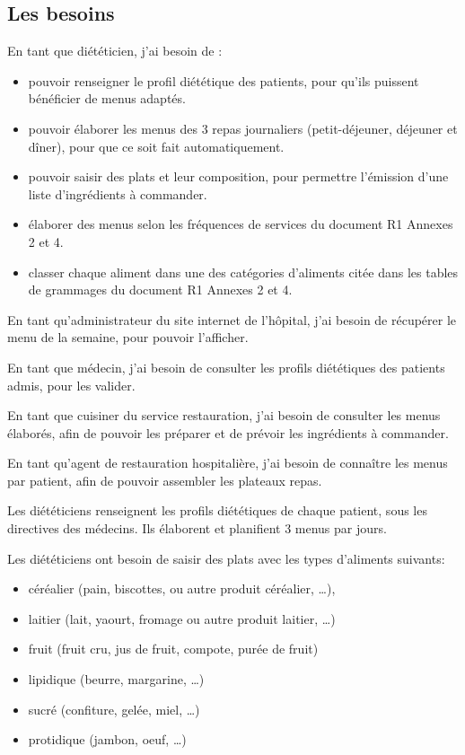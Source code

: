 \subsection{Les besoins}
En tant que diététicien, j’ai besoin de :
\begin{itemize}
 \item pouvoir renseigner le profil diététique des patients, pour qu’ils puissent bénéficier de menus adaptés.
 \item pouvoir élaborer les menus des 3 repas journaliers (petit-déjeuner, déjeuner et dîner), pour que ce soit fait automatiquement.
 \item pouvoir saisir des plats et leur composition, pour permettre l’émission d’une liste d’ingrédients à commander.
 \item élaborer des menus selon les fréquences de services du document R1 Annexes 2 et 4.
 \item classer chaque aliment dans une des catégories d’aliments citée dans les tables de grammages du document R1 Annexes 2 et 4.
\end{itemize}
En tant qu’administrateur du site internet de l’hôpital, j’ai besoin de récupérer le menu de la semaine, pour pouvoir l’afficher.

En tant que médecin, j’ai besoin de consulter les profils diététiques des patients admis, pour les  valider.

En tant que cuisiner du service restauration, j’ai besoin de consulter les menus élaborés, afin de pouvoir les préparer et de prévoir les ingrédients à commander.

En tant qu’agent de restauration hospitalière,  j’ai besoin de connaître les menus par patient, afin de pouvoir assembler les plateaux repas.

Les diététiciens renseignent les profils diététiques de chaque patient, sous les directives des médecins. Ils élaborent et planifient 3 menus par jours.

Les diététiciens ont besoin de saisir des plats avec les types d'aliments suivants:
\begin{itemize}
 \item céréalier (pain, biscottes, ou autre produit céréalier, …),
 \item laitier (lait, yaourt, fromage ou autre produit laitier, …)
 \item fruit (fruit cru, jus de fruit, compote, purée de fruit)
 \item lipidique (beurre, margarine, …)
 \item sucré (confiture, gelée, miel, …)
 \item protidique (jambon, oeuf, …)
\end{itemize}

